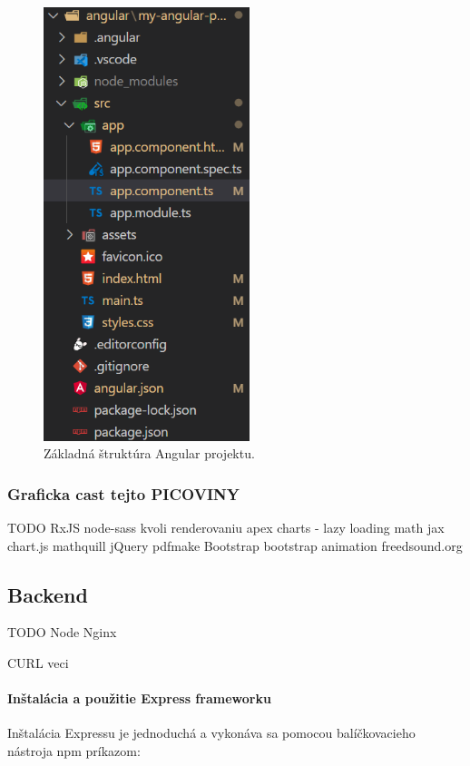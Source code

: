 \begin{figure}[H]
  \centering
  \includegraphics[width=6cm]{img/angular-structure.png}
  \caption{Základná štruktúra Angular projektu.}
  \label{fig:angular-structure}
\end{figure}

\subsubsection{Graficka cast tejto PICOVINY}
TODO
 RxJS
 node-sass kvoli renderovaniu
 apex charts - lazy loading
 math jax 
 chart.js 
 mathquill
 jQuery
 pdfmake
 Bootstrap
 bootstrap animation
 freedsound.org

\subsection{Backend}

 TODO
 Node
 Nginx

 CURL veci

 \paragraph{Inštalácia a použitie Express frameworku}

Inštalácia Expressu je jednoduchá a vykonáva sa pomocou balíčkovacieho nástroja \acrshort{npm} príkazom:

